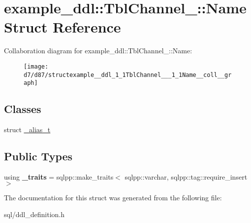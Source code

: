 \hypertarget{structexample__ddl_1_1TblChannel___1_1Name}{}\section{example\+\_\+ddl\+:\+:Tbl\+Channel\+\_\+\+:\+:Name Struct Reference}
\label{structexample__ddl_1_1TblChannel___1_1Name}


Collaboration diagram for example\+\_\+ddl\+:\+:Tbl\+Channel\+\_\+\+:\+:Name\+:
\nopagebreak
\begin{figure}[H]
\begin{center}
\leavevmode
\texttt{[image: d7/d87/structexample\_\_ddl\_1\_1TblChannel\_\_\_1\_1Name\_\_coll\_\_graph]}
\end{center}
\end{figure}
\subsection*{Classes}
\begin{DoxyCompactItemize}
\item 
struct \hyperlink{structexample__ddl_1_1TblChannel___1_1Name_1_1__alias__t}{\+\_\+alias\+\_\+t}
\end{DoxyCompactItemize}
\subsection*{Public Types}
\begin{DoxyCompactItemize}
\item 
\hypertarget{structexample__ddl_1_1TblChannel___1_1Name_a5e56a4ee6fd5fabd90123ed66ba48621}{}using {\bfseries \+\_\+traits} = sqlpp\+::make\+\_\+traits$<$ sqlpp\+::varchar, sqlpp\+::tag\+::require\+\_\+insert $>$\label{structexample__ddl_1_1TblChannel___1_1Name_a5e56a4ee6fd5fabd90123ed66ba48621}

\end{DoxyCompactItemize}


The documentation for this struct was generated from the following file\+:\begin{DoxyCompactItemize}
\item 
sql/ddl\+\_\+definition.\+h\end{DoxyCompactItemize}

